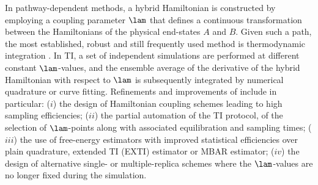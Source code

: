 In pathway-dependent methods, a hybrid Hamiltonian is constructed by employing a coupling parameter $\lam$ that defines a continuous transformation between the Hamiltonians of the physical end-states $A$ and $B$. Given such a path, the most established, robust and still frequently used method 
is  thermodynamic integration\cite{KI33.1,KI34.2,KI35.1} 
.
In TI, a set of 
independent simulations are performed at different constant $\lam$-values, and the 
ensemble average of the derivative of the hybrid Hamiltonian with respect to $\lam$ is 
subsequently integrated by numerical quadrature\cite{JO10.2,BR11.5,BR11.6} 
%
or curve fitting\cite{SH09.12,JO10.2,VI10.6,SH11.7}.
%
%
Refinements and improvements of  include in particular:
($i$) the design of Hamiltonian coupling schemes 
leading to high sampling efficiencies;\cite{CR86.1,BL04.2,PH11.1,PH12.1,NA14.1,NA15.3}
($ii$) the partial automation of the TI protocol\cite{ME93.3,HU16.7,ME17.1,SU17.3,DA18.1}, 
\ie{} of the selection of $\lam$-points along with associated  equilibration  and sampling times;
($iii$) the use of free-energy estimators with improved statistical efficiencies over plain quadrature, \eg{} extended TI (EXTI) estimator\cite{DE16.9} or MBAR estimator\cite{SH08.7};
($iv$) the design of alternative single- or multiple-replica schemes where the $\lam$-values are
no longer fixed during the simulation\cite{LI93.1,TI93.2,KO96.1,SU99.1,MI01.1,IB01.1}. 

